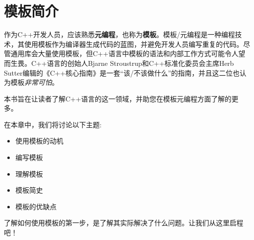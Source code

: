 \chapter{模板简介}
作为C++开发人员，应该熟悉\textbf{元编程}，也称为\textbf{模板}。模板/元编程是一种编程技术，其使用模板作为编译器生成代码的蓝图，并避免开发人员编写重复的代码。尽管通用库会大量使用模板，但C++语言中模板的语法和内部工作方式可能令人望而生畏。C++语言的创始人Bjarne Stroustrup和C++标准化委员会主席Herb Sutter编辑的《C++核心指南》是一套“该/不该做什么”的指南，并且这二位也认为模板\textit{非常可怕}。

本书旨在让读者了解C++语言的这一领域，并助您在模板元编程方面了解的更多。

在本章中，我们将讨论以下主题:

\begin{itemize}
\item 使用模板的动机
\item 编写模板
\item 理解模板
\item 模板简史
\item 模板的优缺点
\end{itemize}

了解如何使用模板的第一步，是了解其实际解决了什么问题。让我们从这里启程吧！








